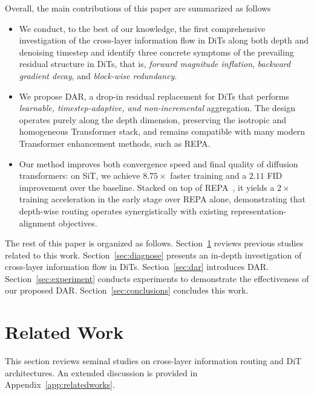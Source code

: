 \documentclass{llmxive}
\begin{document}
Overall, the main contributions of this paper are summarized as follows
\begin{itemize}
    \item We conduct, to the best of our knowledge, the first comprehensive investigation of the cross-layer information flow in DiTs along both depth and denoising timestep and identify three concrete symptoms of the prevailing residual structure in DiTs, that is, \emph{forward magnitude inflation}, \emph{backward gradient decay}, and \emph{block-wise redundancy}.
    \item We propose \textsc{DAR}, a drop-in residual replacement for DiTs that performs \emph{learnable, timestep-adaptive, and non-incremental} aggregation. The design operates purely along the depth dimension, preserving the isotropic and homogeneous Transformer stack, and remains compatible with many modern Transformer enhancement methods, such as REPA.
    \item Our method improves both convergence speed and final quality of diffusion transformers: on SiT, we achieve $8.75 \times$ faster training and a $2.11$ FID improvement over the baseline. Stacked on top of REPA~\citep{yu2025repa}, it yields a $2\times$ training acceleration in the early stage over REPA alone, demonstrating that depth-wise routing operates synergistically with existing representation-alignment objectives.
\end{itemize}
The rest of this paper is organized as follows. Section~\ref{sec:rw} reviews previous studies related to this work. Section~\ref{sec:diagnose} presents an in-depth investigation of cross-layer information flow in DiTs. Section~\ref{sec:dar} introduces DAR. Section~\ref{sec:experiment} conducts experiments to demonstrate the effectiveness of our proposed DAR. Section~\ref{sec:conclusions} concludes this work.



\section{Related Work}  \label{sec:rw}

This section reviews seminal studies on cross-layer information routing and DiT architectures. An extended discussion is provided in Appendix~\ref{app:relatedworks}.
\vspace{-1em}
\end{document}
